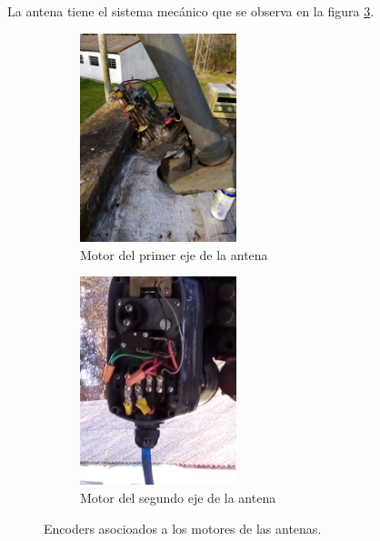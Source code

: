 La antena tiene el sistema mecánico que se observa en la figura \ref{fig_mec_ant}. 
\begin{figure}[ht]
	\begin{subfigure}{0.5\textwidth}
		\centering
		\includegraphics[width=0.5\textwidth]{parte_1/cap1/mot1}
		\caption{Motor del primer eje de la antena }
		\label{fig_mec_ant1}		
	\end{subfigure}
	\hfill 
	\begin{subfigure}{0.5\textwidth}
		\centering
		\includegraphics[width=0.5\textwidth]{parte_1/cap1/mot2}
		\caption{Motor del segundo eje de la antena }
		\label{fig_mec_ant2}
	\end{subfigure}
	
	\caption{Encoders asocioados a los motores de las antenas.}
	\label{fig_mec_ant}
\end{figure}


